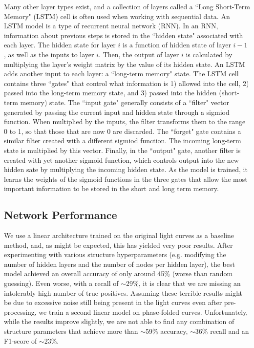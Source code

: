 \documentclass{article}
\begin{document}
Many other layer types exist, and a collection of layers called a ``Long Short-Term Memory" (LSTM) cell is often used when working with sequential data. An LSTM model is a type of recurrent neural network (RNN). In  an RNN, information about previous steps is stored in the ``hidden state" associated with each layer. The hidden state for layer $i$ is a function of hidden state of layer $i-1$ , as well as the inputs to layer $i$. Then, the output of layer $i$ is calculated by multiplying the layer's weight matrix by the value of its hidden state. An LSTM adds another input to each layer: a ``long-term memory" state. The LSTM cell contains three ``gates" that control what information is 1) allowed into the cell, 2) passed into the long-term memory state, and 3) passed into the hidden (short-term memory) state. The ``input gate" generally consists of a ``filter" vector generated by passing the current input and hidden state through a sigmiod function. When multiplied by the inputs, the filter transforms them to the range 0 to 1, so that those that are now 0 are discarded. The ``forget" gate contains a similar filter created with a different sigmiod function. The incoming long-term state is multiplied by this vector. Finally, in the ``output" gate, another filter is created with yet another sigmoid function, which controls output into the new hidden sate by multiplying the incoming hidden state. As the model is trained, it learns the weights of the sigmoid functions in the three gates that allow the most important information to be stored in the short and long term memory.


\subsection{Network Performance}

We use a linear architecture trained on the original light curves as a baseline method, and, as might be expected, this has yielded very poor results. After experimenting with various structure hyperparameters (e.g. modifying the number of hidden layers and the number of nodes per hidden layer), the best model achieved an overall accuracy of only around 45\% (worse than random guessing). Even worse, with a recall of $\sim$29\%, it is clear that we are missing an intolerably high number of true positives. Assuming these terrible results might be due to excessive noise still being present in the light curves even after pre-processing, we train a second linear model on phase-folded curves. Unfortunately, while the results improve slightly, we are not able to find any combination of structure parameters that achieve more than $\sim$59\% accuracy, $\sim$36\% recall and an F1-score of $\sim$23\%. 
\end{document}

